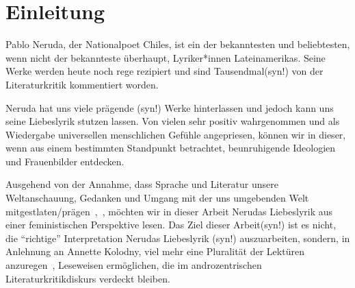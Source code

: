 \section{Einleitung}

Pablo Neruda, der Nationalpoet Chiles, ist ein der bekanntesten und beliebtesten, wenn nicht der bekannteste überhaupt, Lyriker*innen Lateinamerikas.
Seine Werke werden heute noch rege rezipiert und sind Tausendmal(syn!) von der Literaturkritik kommentiert worden.


Neruda hat uns viele prägende (syn!) Werke hinterlassen und jedoch kann uns seine Liebeslyrik stutzen lassen.
Von vielen sehr positiv wahrgenommen und als Wiedergabe universellen menschlichen Gefühle angepriesen, können wir in dieser, wenn aus einem bestimmten Standpunkt betrachtet, beunruhigende Ideologien und Frauenbilder entdecken.

Ausgehend von der Annahme, dass Sprache und Literatur unsere Weltanschauung, Gedanken und Umgang mit der uns umgebenden Welt mitgestlaten/prägen~\autocite{Kolodny1980},~\autocite{North2013},
möchten wir in dieser Arbeit Nerudas Liebeslyrik aus einer feministischen Perspektive lesen.
Das Ziel dieser Arbeit(syn!) ist es nicht, die ``richtige'' Interpretation Nerudas Liebeslyrik (syn!) auszuarbeiten, sondern, in Anlehnung an Annette Kolodny, viel mehr eine Pluralität der Lektüren anzuregen~\autocite{Kolodny1980}, Leseweisen ermöglichen, die im androzentrischen Literaturkritikdiskurs verdeckt bleiben.

\begin{comment}
``In my view, our purpose is not and should not be the formula-
tion of any single reading method or potentially procrustean set
of critical procedures nor, even less, the generation of prescriptive
categories for some dreamed-of nonsexist literary canon.52 Instead,
as I see it, our task is to initiate nothing less than a playful pluralism,
responsive to the possibilities of multiple critical schools and meth-
ods, but captive of none, recognizing that the many tools needed
for our analysis will necessarily be largely inherited and only partly
of our own making. Only by employing a plurality of methods
will we protect ourselves from the temptation of so oversimplifying
any text''~\autocite{Kolodny1980}
\end{comment}

